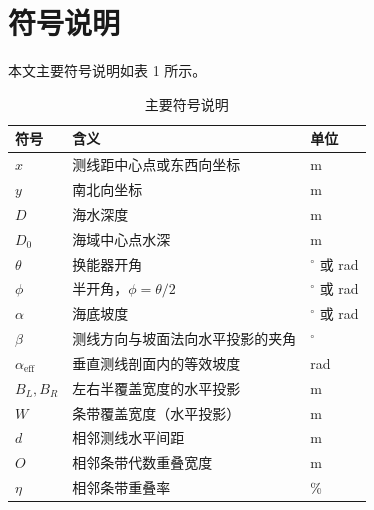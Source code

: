 \section{符号说明}

本文主要符号说明如表 1 所示。

\begin{table}[H]
  \centering
  \caption{主要符号说明}
  \label{tab:symbols}
  \begin{tabular}{lll}
    \toprule
    \textbf{符号} & \textbf{含义} & \textbf{单位} \\
    \midrule
    $x$ & 测线距中心点或东西向坐标 & m \\
    $y$ & 南北向坐标 & m \\
    $D$ & 海水深度 & m \\
    $D_0$ & 海域中心点水深 & m \\
    $\theta$ & 换能器开角 & $^\circ$ 或 rad \\
    $\phi$ & 半开角，$\phi=\theta/2$ & $^\circ$ 或 rad \\
    $\alpha$ & 海底坡度 & $^\circ$ 或 rad \\
    $\beta$ & 测线方向与坡面法向水平投影的夹角 & $^\circ$ \\
    $\alpha_{\mathrm{eff}}$ & 垂直测线剖面内的等效坡度 & rad \\
    $B_L,B_R$ & 左右半覆盖宽度的水平投影 & m \\
    $W$ & 条带覆盖宽度（水平投影） & m \\
    $d$ & 相邻测线水平间距 & m \\
    $O$ & 相邻条带代数重叠宽度 & m \\
    $\eta$ & 相邻条带重叠率 & \% \\
    \bottomrule
  \end{tabular}
\end{table}
